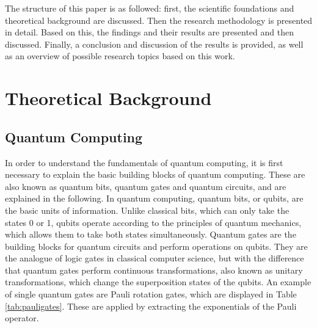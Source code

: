 The structure of this paper is as followed: first, the scientific foundations and theoretical background are discussed. Then the research methodology is presented in detail. Based on this, the findings and their results are presented and then discussed. Finally, a conclusion and discussion of the results is provided, as well as an overview of possible research topics based on this work.   

\section{Theoretical Background}
\subsection{Quantum Computing}
In order to understand the fundamentals of quantum computing, it is first necessary to explain the basic building blocks of quantum computing. These are also known as quantum bits, quantum gates and quantum circuits, and are explained in the following. In quantum computing, quantum bits, or qubits, are the basic units of information. Unlike classical bits, which can only take the states 0 or 1, qubits operate according to the principles of quantum mechanics, which allows them to take both states simultaneously. \cite{claudino2022basics} Quantum gates are the building blocks for quantum circuits and perform operations on qubits. They are the analogue of logic gates in classical computer science, but with the difference that quantum gates perform continuous transformations, also known as unitary transformations, which change the superposition states of the qubits. An example of single quantum gates are Pauli rotation gates, which are displayed in Table \ref{tab:pauligates}. These are applied by extracting the exponentials of the Pauli operator.

